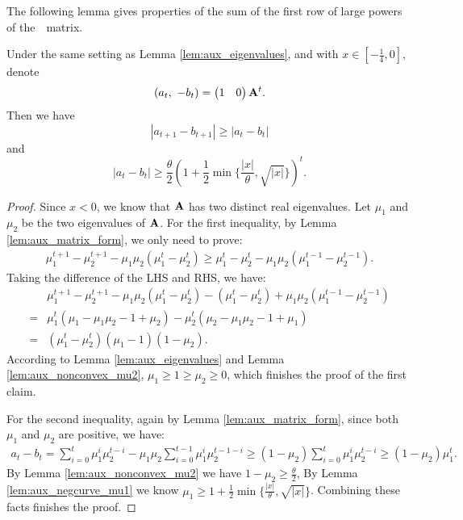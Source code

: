 \noindent
The following lemma gives properties of the sum of the first 
row of large powers of the~\nag~matrix.
\begin{lemma}\label{lem:aux_increase_t}
Under the same setting as Lemma \ref{lem:aux_eigenvalues}, 
and with $x \in [-\frac{1}{4}, 0]$, denote
\begin{equation*}
(a_t, ~-b_t) = \begin{pmatrix} 1 & 0  \end{pmatrix} \mathbf{A}^t.
\end{equation*}
Then we have
$$|a_{t+1} - b_{t+1}| \ge |a_t - b_t|$$
and
$$|a_t - b_t| \ge \frac{\theta}{2}\left(1 + \frac{1}{2}\min\{\frac{|x|}{\theta}, \sqrt{|x|}\}\right)^t.$$
\end{lemma}
\begin{proof}
Since $x<0$, we know that $\mathbf{A}$ has two distinct real eigenvalues. 
Let $\mu_1$ and $\mu_2$ be the two eigenvalues of $\mathbf{A}$.
For the first inequality, by Lemma \ref{lem:aux_matrix_form}, we only need to prove:
\begin{align*}
\mu_1^{t+1} - \mu_2^{t+1} - \mu_1\mu_2(\mu_1^{t} - \mu_2^{t})
\ge \mu_1^{t} - \mu_2^{t} - \mu_1\mu_2(\mu_1^{t-1} - \mu_2^{t-1}).
\end{align*}
Taking the difference of the LHS and RHS, we have:
\begin{align*}
& \mu_1^{t+1} - \mu_2^{t+1} - \mu_1\mu_2(\mu_1^{t} - \mu_2^{t}) - 
(\mu_1^{t} - \mu_2^{t}) + \mu_1\mu_2(\mu_1^{t-1} - \mu_2^{t-1}) \\
=& \mu_1^{t}(\mu_1 - \mu_1\mu_2 - 1  + \mu_2) - \mu_2^{t}(\mu_2 - \mu_1\mu_2 - 1 +\mu_1)\\
=& (\mu_1^t - \mu_2^t)(\mu_1 - 1)(1-\mu_2).
\end{align*}
According to Lemma \ref{lem:aux_eigenvalues} and Lemma \ref{lem:aux_nonconvex_mu2},
$\mu_1 \ge 1 \ge \mu_2 \ge 0$, which finishes the proof of the first claim.

For the second inequality, again by Lemma \ref{lem:aux_matrix_form}, 
since both $\mu_1$ and $\mu_2$ are positive, we have:
\begin{align*}
a_t - b_t = \sum_{i=0}^t \mu_1^i \mu_2^{t-i} - \mu_1\mu_2\sum_{i=0}^{t-1} \mu_1^{i} \mu_2^{t-1-i}
\ge (1-\mu_2)\sum_{i=0}^t \mu_1^i \mu_2^{t-i} \ge (1-\mu_2)\mu_1^t.
\end{align*}
By Lemma \ref{lem:aux_nonconvex_mu2} we have $1-\mu_2 \ge \frac{\theta}{2}$, 
By Lemma \ref{lem:aux_negcurve_mu1} we know $\mu_1 \ge 1 + \frac{1}{2}\min\{\frac{|x|}{\theta}, \sqrt{|x|}\}$.
Combining these facts finishes the proof.
\end{proof}


